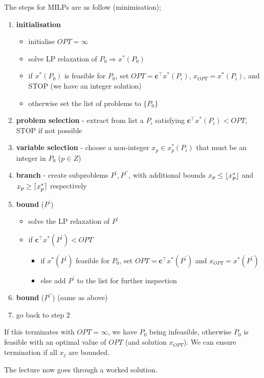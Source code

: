 \documentclass[a4paper, 12pt]{article}
\DeclarePairedDelimiter{\ceil}{\lceil}{\rceil}
\DeclarePairedDelimiter{\floor}{\lfloor}{\rfloor}
\renewcommand{\vec}[1]{\boldsymbol{#1}}
\begin{document}
                The steps for MILPs are as follow (minimisation);
                \begin{enumerate}[1.]
                    \itemsep0em
                    \item \textbf{initialisation}
                        \begin{itemize}
                            \itemsep0em
                            \item initialise $OPT = \infty$
                            \item solve LP relaxation of $P_0 \Rightarrow x^*(P_0)$
                            \item if $x^*(P_0)$ is feasible for $P_0$, set $OPT = \vec{c}^\top x^*(P_i)$, $x_{OPT} = x^*(P_i)$, and STOP (we have an integer solution)
                            \item otherwise set the list of problems to $\{P_0\}$
                        \end{itemize}
                    \item \textbf{problem selection} - extract from list a $P_i$ satisfying $\vec{c}^\top x^*(P_i) < OPT$, STOP if not possible
                    \item \textbf{variable selection} - choose a non-integer $x_p \in x^*_p(P_i)$ that must be an integer in $P_0$ ($p \in Z$)
                    \item \textbf{branch} - create subproblems $P^\prime, P^{\prime\prime}$, with additional bounds $x_p \leq \floor{x^*_p}$ and $x_p \geq \ceil{x^*_p}$ respectively
                    \item \textbf{bound} ($P^\prime$)
                        \begin{itemize}
                            \itemsep0em
                            \item solve the LP relaxation of $P^\prime$
                            \item if $\vec{c}^\top x^*(P^\prime) < OPT$
                                \begin{itemize}
                                    \itemsep0em
                                    \item if $x^*(P^\prime)$ feasible for $P_0$, set $OPT = \vec{c}^\top x^*(P^\prime)$ and $x_{OPT} = x^*(P^\prime)$
                                    \item else add $P^\prime$ to the list for further inspection
                                \end{itemize}
                        \end{itemize}
                    \item \textbf{bound} ($P^{\prime\prime}$) (same as above)
                    \item go back to step 2
                \end{enumerate}
                If this terminates with $OPT = \infty$, we have $P_0$ being infeasible, otherwise $P_0$ is feasible with an optimal value of $OPT$ (and solution $x_{OPT}$).
                We can ensure termination if all $x_j$ are bounded.
                \medskip

                The lecture now goes through a worked solution.
\end{document}
